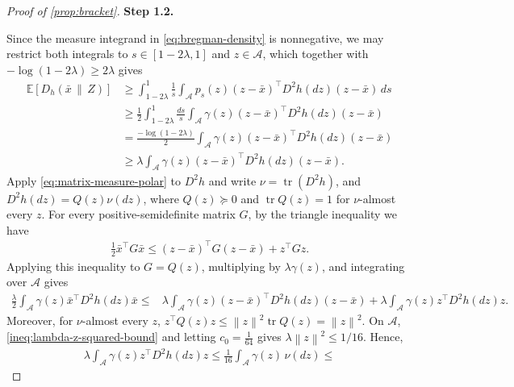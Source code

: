 \documentclass[11pt]{article}
\newcommand{\proofstepinline}[1]{%
    {\sffamily\bfseries\color{blue!55!black}Step #1.}\enspace
}
\newcommand{\E}{\mathbb E}
\newcommand{\tr}{\operatorname{tr}}
\newcommand{\1}{\mathbf 1}
\newcommand{\norm}[1]{\left\lVert #1\right\rVert}
\begin{document}
\begin{proof}[Proof of \cref{prop:bracket}]
    \proofstepinline{1.2}
    Since the measure integrand in \eqref{eq:bregman-density} is
    nonnegative, we may restrict both integrals to
    $s\in[1-2\lambda,1]$ and $z\in\mathcal A$,
    which together with $-\log(1-2\lambda)\geq2\lambda$ gives
    \begin{align}
        \E[D_h(\bar{x}\,\|\,Z)]
         & \geq
        \int_{1-2\lambda}^1\frac1s
        \int_{\mathcal A}
        p_s(z)(z-\bar{x})^\top D^2h(dz)(z-\bar{x})\,ds
        \\
         & \geq
        \frac12
        \int_{1-2\lambda}^1\frac{ds}{s}
        \int_{\mathcal A}
        \gamma(z)(z-\bar{x})^\top D^2h(dz)(z-\bar{x})
        \\
         & =
        \frac{-\log(1-2\lambda)}{2}
        \int_{\mathcal A}
        \gamma(z)(z-\bar{x})^\top D^2h(dz)(z-\bar{x})
        \\
         & \geq
        \lambda
        \int_{\mathcal A}
        \gamma(z)(z-\bar{x})^\top D^2h(dz)(z-\bar{x}).
        \label{eq:bregman-lower}
    \end{align}
    Apply \eqref{eq:matrix-measure-polar} to $D^2h$ and write
    $\nu=\tr(D^2h)$, and $D^2h(dz)=Q(z)\nu(dz)$,
    where $Q(z)\succeq0$ and $\tr Q(z)=1$ for $\nu$-almost every $z$.
    For every positive-semidefinite matrix $G$, by the triangle inequality we have
    \begin{align}
        \frac12\bar{x}^\top G\bar{x}
        \leq
        (z-\bar{x})^\top G(z-\bar{x})+z^\top Gz.
    \end{align}
    Applying this inequality to $G=Q(z)$, multiplying by
    $\lambda\gamma(z)$, and integrating over $\mathcal A$ gives
    \begin{align}
        \frac\lambda2
        \int_{\mathcal A}
        \gamma(z)\bar{x}^\top D^2h(dz)\bar{x}
        \leq{} &
        \lambda
        \int_{\mathcal A}
        \gamma(z)(z-\bar{x})^\top D^2h(dz)(z-\bar{x})
        +
        \lambda
        \int_{\mathcal A}
        \gamma(z)z^\top D^2h(dz)z.
    \end{align}
    Moreover, for $\nu$-almost every $z$,
    $z^\top Q(z)z
        \leq
        \norm{z}^2\tr Q(z)
        =
        \norm{z}^2.$
    On $\mathcal A$, \eqref{ineq:lambda-z-squared-bound}
    and letting $c_0=\frac{1}{64}$ gives $\lambda\norm{z}^2\leq1/16$.
    Hence,
    \begin{align}
        \lambda
        \int_{\mathcal A}
        \gamma(z)z^\top D^2h(dz)z
        \leq
        \frac1{16}
        \int_{\mathcal A}\gamma(z)\,\nu(dz)
        \leq

\end{align}
\end{proof}
\end{document}
